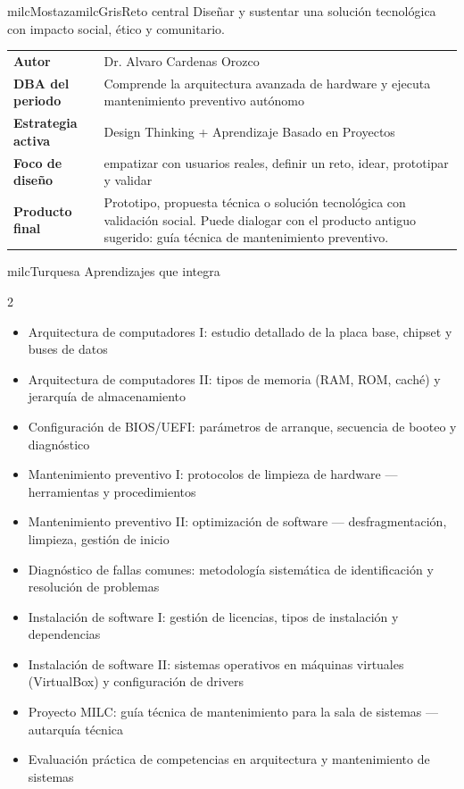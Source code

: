 \documentclass[11pt,letterpaper]{article}
\begin{document}
\begin{softbox}{milcMostaza}{milcGris}{Reto central}
Diseñar y sustentar una solución tecnológica con impacto social, ético y comunitario.
\end{softbox}

\begin{tabularx}{\textwidth}{>{\bfseries}p{3.4cm}X}
\rowcolor{milcMagenta!12}Autor & Dr. Alvaro Cardenas Orozco\\
DBA del periodo & Comprende la arquitectura avanzada de hardware y ejecuta mantenimiento preventivo autónomo\\
Estrategia activa & Design Thinking + Aprendizaje Basado en Proyectos\\
Foco de diseño & empatizar con usuarios reales, definir un reto, idear, prototipar y validar\\
Producto final & Prototipo, propuesta técnica o solución tecnológica con validación social. Puede dialogar con el producto antiguo sugerido: guía técnica de mantenimiento preventivo.\\
\end{tabularx}

\begin{titlebox}{milcTurquesa}
Aprendizajes que integra
\end{titlebox}
\begin{multicols}{2}
\begin{itemize}[leftmargin=*]
\item Arquitectura de computadores I: estudio detallado de la placa base, chipset y buses de datos
\item Arquitectura de computadores II: tipos de memoria (RAM, ROM, caché) y jerarquía de almacenamiento
\item Configuración de BIOS/UEFI: parámetros de arranque, secuencia de booteo y diagnóstico
\item Mantenimiento preventivo I: protocolos de limpieza de hardware — herramientas y procedimientos
\item Mantenimiento preventivo II: optimización de software — desfragmentación, limpieza, gestión de inicio
\item Diagnóstico de fallas comunes: metodología sistemática de identificación y resolución de problemas
\item Instalación de software I: gestión de licencias, tipos de instalación y dependencias
\item Instalación de software II: sistemas operativos en máquinas virtuales (VirtualBox) y configuración de drivers
\item Proyecto MILC: guía técnica de mantenimiento para la sala de sistemas — autarquía técnica
\item Evaluación práctica de competencias en arquitectura y mantenimiento de sistemas
\end{itemize}
\end{multicols}
\end{document}
